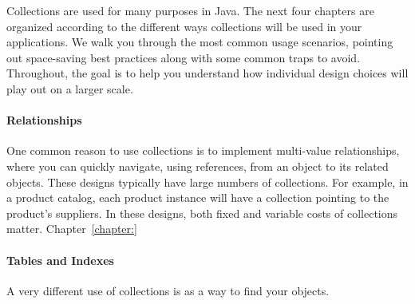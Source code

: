 Collections are used for many purposes in Java.  The next four chapters are
organized according to the different ways collections will be used in your
applications. We walk you through the most common usage scenarios, pointing out
space-saving best practices along with some common traps to avoid. 
Throughout, the goal is to help you understand how individual design choices
will play out on a larger scale.


\paragraph{Relationships} One common reason to use collections is to implement
multi-value relationships, where you can quickly navigate, using references,
from an object to its related objects. These
designs typically have large numbers of collections. For example, in a product catalog, each product
instance will have a collection pointing to the product's suppliers. In these
designs, both fixed and variable costs of collections matter. Chapter~\ref{chapter:}

\paragraph{Tables and Indexes} A very different use of collections is as a way
to find your objects. 


